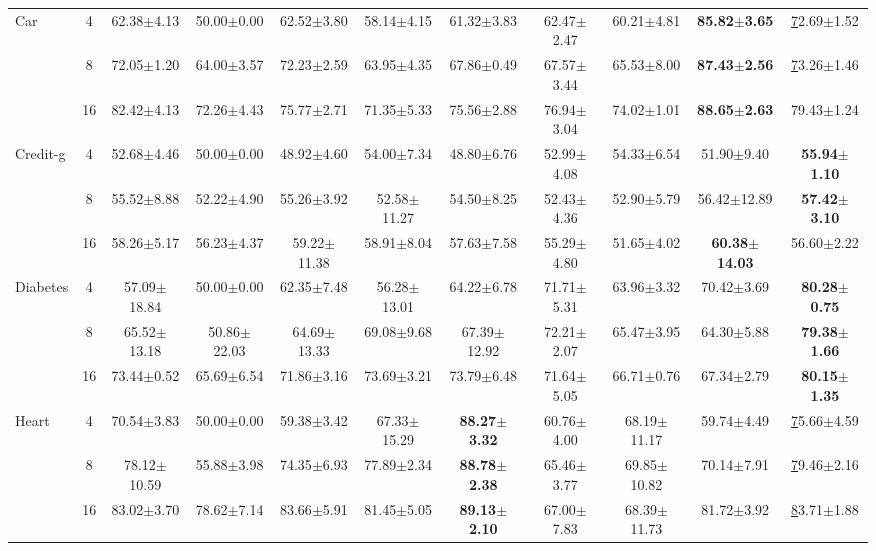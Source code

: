 \begin{table}[t!]
{\begin{tabular}{@{}l|c|cccccccc|c@{}}
Car & 4 & 62.38$\pm$4.13 & 50.00$\pm$0.00 & 62.52$\pm$3.80 & 58.14$\pm$4.15 & 61.32$\pm$3.83 & 62.47$\pm$2.47 & 60.21$\pm$4.81 & \textbf{85.82$\pm$3.65} & {\ul 72.69$\pm$1.52} \\
 & 8 & 72.05$\pm$1.20 & 64.00$\pm$3.57 & 72.23$\pm$2.59 & 63.95$\pm$4.35 & 67.86$\pm$0.49 & 67.57$\pm$3.44 & 65.53$\pm$8.00 & \textbf{87.43$\pm$2.56} & {\ul 73.26$\pm$1.46} \\
 & 16 & 82.42$\pm$4.13 & 72.26$\pm$4.43 & 75.77$\pm$2.71 & 71.35$\pm$5.33 & 75.56$\pm$2.88 & 76.94$\pm$3.04 & 74.02$\pm$1.01 & \textbf{88.65$\pm$2.63} & 79.43$\pm$1.24 \\ \midrule
Credit-g & 4 & 52.68$\pm$4.46 & 50.00$\pm$0.00 & 48.92$\pm$4.60 & 54.00$\pm$7.34 & 48.80$\pm$6.76 & 52.99$\pm$4.08 & 54.33$\pm$6.54 & 51.90$\pm$9.40 & \textbf{55.94$\pm$1.10} \\
 & 8 & 55.52$\pm$8.88 & 52.22$\pm$4.90 & 55.26$\pm$3.92 & 52.58$\pm$11.27 & 54.50$\pm$8.25 & 52.43$\pm$4.36 & 52.90$\pm$5.79 & 56.42$\pm$12.89 & \textbf{57.42$\pm$3.10} \\
 & 16 & 58.26$\pm$5.17 & 56.23$\pm$4.37 & 59.22$\pm$11.38 & 58.91$\pm$8.04 & 57.63$\pm$7.58 & 55.29$\pm$4.80 & 51.65$\pm$4.02 & \textbf{60.38$\pm$14.03} & 56.60$\pm$2.22 \\ \midrule
Diabetes & 4 & 57.09$\pm$18.84 & 50.00$\pm$0.00 & 62.35$\pm$7.48 & 56.28$\pm$13.01 & 64.22$\pm$6.78 & 71.71$\pm$5.31 & 63.96$\pm$3.32 & 70.42$\pm$3.69 & \textbf{80.28$\pm$0.75} \\
 & 8 & 65.52$\pm$13.18 & 50.86$\pm$22.03 & 64.69$\pm$13.33 & 69.08$\pm$9.68 & 67.39$\pm$12.92 & 72.21$\pm$2.07 & 65.47$\pm$3.95 & 64.30$\pm$5.88 & \textbf{79.38$\pm$1.66} \\
 & 16 & 73.44$\pm$0.52 & 65.69$\pm$6.54 & 71.86$\pm$3.16 & 73.69$\pm$3.21 & 73.79$\pm$6.48 & 71.64$\pm$5.05 & 66.71$\pm$0.76 & 67.34$\pm$2.79 & \textbf{80.15$\pm$1.35} \\ \midrule
Heart & 4 & 70.54$\pm$3.83 & 50.00$\pm$0.00 & 59.38$\pm$3.42 & 67.33$\pm$15.29 & \textbf{88.27$\pm$3.32} & 60.76$\pm$4.00 & 68.19$\pm$11.17 & 59.74$\pm$4.49 & {\ul 75.66$\pm$4.59} \\
 & 8 & 78.12$\pm$10.59 & 55.88$\pm$3.98 & 74.35$\pm$6.93 & 77.89$\pm$2.34 & \textbf{88.78$\pm$2.38} & 65.46$\pm$3.77 & 69.85$\pm$10.82 & 70.14$\pm$7.91 & {\ul 79.46$\pm$2.16} \\
 & 16 & 83.02$\pm$3.70 & 78.62$\pm$7.14 & 83.66$\pm$5.91 & 81.45$\pm$5.05 & \textbf{89.13$\pm$2.10} & 67.00$\pm$7.83 & 68.39$\pm$11.73 & 81.72$\pm$3.92 & {\ul 83.71$\pm$1.88} \\ \midrule

\end{tabular}}
\end{table}
